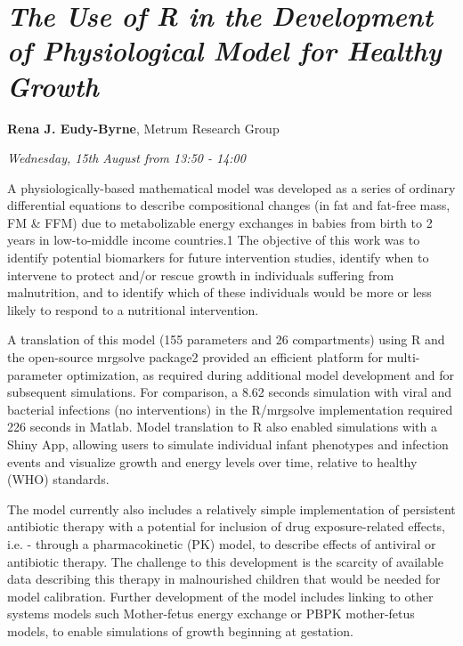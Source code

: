 \documentclass[]{book}
\theoremstyle{definition}
\theoremstyle{definition}
\theoremstyle{definition}
\theoremstyle{remark}
\begin{document}
\hypertarget{the-use-of-r-in-the-development-of-physiological-model-for-healthy-growth}{%
\section{\texorpdfstring{\emph{The Use of R in the Development of
Physiological Model for Healthy
Growth}}{The Use of R in the Development of Physiological Model for Healthy Growth}}\label{the-use-of-r-in-the-development-of-physiological-model-for-healthy-growth}}

\textbf{Rena J. Eudy-Byrne}, Metrum Research Group

\emph{Wednesday, 15th August from 13:50 - 14:00}

A physiologically-based mathematical model was developed as a series of
ordinary differential equations to describe compositional changes (in
fat and fat-free mass, FM \& FFM) due to metabolizable energy exchanges
in babies from birth to 2 years in low-to-middle income countries.1 The
objective of this work was to identify potential biomarkers for future
intervention studies, identify when to intervene to protect and/or
rescue growth in individuals suffering from malnutrition, and to
identify which of these individuals would be more or less likely to
respond to a nutritional intervention.

A translation of this model (155 parameters and 26 compartments) using R
and the open-source mrgsolve package2 provided an efficient platform for
multi-parameter optimization, as required during additional model
development and for subsequent simulations. For comparison, a 8.62
seconds simulation with viral and bacterial infections (no
interventions) in the R/mrgsolve implementation required 226 seconds in
Matlab. Model translation to R also enabled simulations with a Shiny
App, allowing users to simulate individual infant phenotypes and
infection events and visualize growth and energy levels over time,
relative to healthy (WHO) standards.

The model currently also includes a relatively simple implementation of
persistent antibiotic therapy with a potential for inclusion of drug
exposure-related effects, i.e. - through a pharmacokinetic (PK) model,
to describe effects of antiviral or antibiotic therapy. The challenge to
this development is the scarcity of available data describing this
therapy in malnourished children that would be needed for model
calibration. Further development of the model includes linking to other
systems models such Mother-fetus energy exchange or PBPK mother-fetus
models, to enable simulations of growth beginning at gestation.
\end{document}
